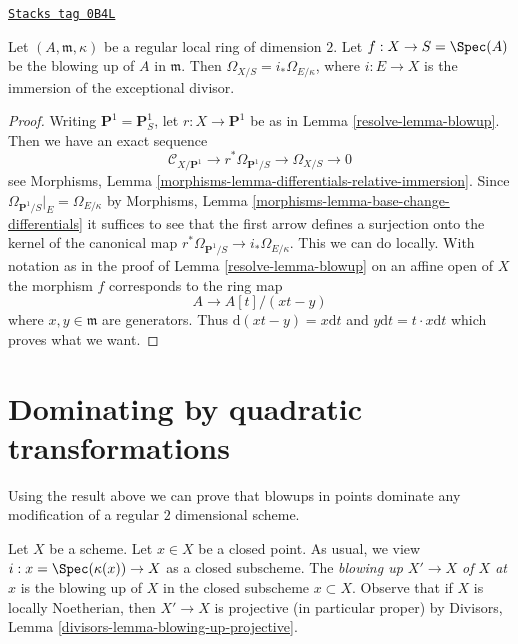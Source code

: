 \begin{lemma}
\label{resolve-lemma-differentials-of-blowup}
\href{https://stacks.math.columbia.edu/tag/0B4L}{\texttt{Stacks tag 0B4L}}

Let $(A, \mathfrak m, \kappa)$ be a regular local ring of dimension $2$.
Let $f : X \to S = \Spec(A)$ be the blowing up of $A$ in $\mathfrak m$.
Then $\Omega_{X/S} = i_*\Omega_{E/\kappa}$, where $i : E \to X$
is the immersion of the exceptional divisor.
\end{lemma}

\begin{proof}

Writing $\mathbf{P}^1 = \mathbf{P}^1_S$, let
$r : X \to \mathbf{P}^1$ be as in Lemma \ref{resolve-lemma-blowup}.
Then we have an exact sequence
$$
\mathcal{C}_{X/\mathbf{P}^1} \to r^*\Omega_{\mathbf{P}^1/S} \to
\Omega_{X/S} \to 0
$$
see Morphisms, Lemma \ref{morphisms-lemma-differentials-relative-immersion}.
Since $\Omega_{\mathbf{P}^1/S}|_E = \Omega_{E/\kappa}$ by
Morphisms, Lemma \ref{morphisms-lemma-base-change-differentials}
it suffices to see that the first arrow defines a surjection
onto the kernel of the canonical map
$r^*\Omega_{\mathbf{P}^1/S} \to i_*\Omega_{E/\kappa}$.
This we can do locally. With notation as in the proof of
Lemma \ref{resolve-lemma-blowup} on an affine open of $X$ the morphism $f$
corresponds to the ring map
$$
A \to A[t]/(xt - y)
$$
where $x, y \in \mathfrak m$ are generators. Thus
$\text{d}(xt - y) = x\text{d}t$ and $y\text{d}t = t \cdot x \text{d}t$
which proves what we want.
\end{proof}

\section{Dominating by quadratic transformations}
\label{resolve-section-dominating-by-quadratic}
Using the result above we can prove that blowups in points dominate
any modification of a regular $2$ dimensional scheme.

\medskip\noindent
Let $X$ be a scheme. Let $x \in X$ be a closed point. As usual, we view
$i : x = \Spec(\kappa(x)) \to X$ as a closed subscheme.
The {\it blowing up $X' \to X$ of $X$ at $x$} is the blowing up of $X$
in the closed subscheme $x \subset X$. Observe that if $X$ is locally
Noetherian, then $X' \to X$ is projective (in particular proper) by
Divisors, Lemma \ref{divisors-lemma-blowing-up-projective}.

